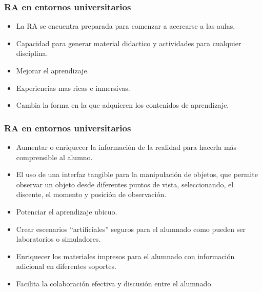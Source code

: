 \begin{frame}
	\frametitle{RA en entornos universitarios}
				\begin{itemize}
					\item La RA se encuentra preparada para comenzar a acercarse a las aulas.
					\item Capacidad para generar material didactico y actividades para cualquier disciplina.
					\item Mejorar el aprendizaje.
					\item Experiencias mas ricas e inmersivas.
					\item Cambia la forma en la que adquieren los contenidos de aprendizaje.
				\end{itemize}
			\endblock{}
\end{frame}


\begin{frame}
	\frametitle{RA en entornos universitarios}
			\begin{itemize}
				\item Aumentar o enriquecer la información de la realidad para hacerla más comprensible al alumno.
			
				\item El uso de una interfaz tangible para la manipulación de objetos, que permite observar un objeto desde diferentes puntos de vista,
				seleccionando, el discente, el momento y posición de observación.
			
				\item Potenciar el aprendizaje ubicuo.
				
				\item Crear escenarios ``artificiales'' seguros para el alumnado
				como pueden ser laboratorios o simuladores. 
			
				\item Enriquecer los materiales impresos para el alumnado con información adicional en diferentes soportes.
				
				\item Facilita la colaboración efectiva y discusión entre el alumnado.
			\end{itemize}
		\endblock{}
\end{frame}




